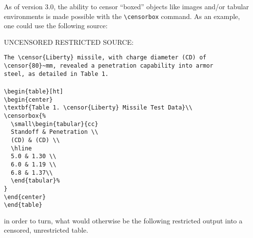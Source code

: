 \documentclass{article}
\begin{document}
As of version 3.0, the ability to censor ``boxed'' objects like images
and/or tabular environments is made possible with the \verb|\censorbox|
command.  As an example, one could use the following source:

{\addtolength{\leftskip}{2.3em}
UNCENSORED RESTRICTED SOURCE: \hrulefill

\verb|The \censor{Liberty} missile, with charge diameter (CD) of|\\
\verb|\censor{80}~mm, revealed a penetration capability into armor|\\
\verb|steel, as detailed in Table 1.|\\
\verb||\\
\verb|\begin{table}[ht]|\\
\verb|\begin{center}|\\
\verb|\textbf{Table 1. \censor{Liberty} Missile Test Data}\\|\\
\verb|\censorbox{%|\\
\verb|  \small\begin{tabular}{cc}|\\
\verb|  Standoff & Penetration \\|\\
\verb|  (CD) & (CD) \\|\\
\verb|  \hline|\\
\verb|  5.0 & 1.30 \\|\\
\verb|  6.0 & 1.19 \\|\\
\verb|  6.8 & 1.37\\|\\
\verb|  \end{tabular}%|\\
\verb|}|\\
\verb|\end{center}|\\
\verb|\end{table}|\\

\hrulefill

}

in order to turn, what would otherwise be the following restricted
output into a censored, unrestricted table.
\end{document}
